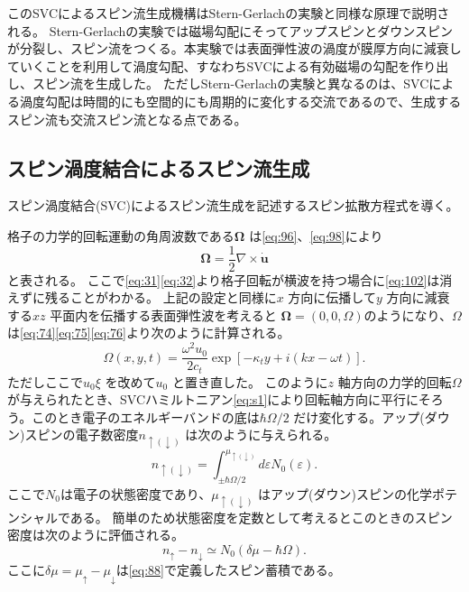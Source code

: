 \documentclass[dvipdfmx]{jsreport}
\numberwithin{equation}{chapter}
\numberwithin{table}{chapter}
\begin{document}
このSVCによるスピン流生成機構はStern-Gerlachの実験と同様な原理で説明される。
Stern-Gerlachの実験では磁場勾配にそってアップスピンとダウンスピンが分裂し、スピン流をつくる。本実験では表面弾性波の渦度が膜厚方向に減衰していくことを利用して渦度勾配、すなわちSVCによる有効磁場の勾配を作り出し、スピン流を生成した。
ただしStern-Gerlachの実験と異なるのは、SVCによる渦度勾配は時間的にも空間的にも周期的に変化する交流であるので、生成するスピン流も交流スピン流となる点である。
\subsection{スピン渦度結合によるスピン流生成}
スピン渦度結合(SVC)によるスピン流生成を記述するスピン拡散方程式を導く。

格子の力学的回転運動の角周波数である$\bm{\Omega}$ は\eqref{eq:96}、\eqref{eq:98}により
\begin{equation}
\label{eq:102}
	\bm{\Omega}=\frac{1}{2} \nabla \times \dot{\bm{u}}
\end{equation}
と表される。
ここで\eqref{eq:31}\eqref{eq:32}より格子回転が横波を持つ場合に\eqref{eq:102}は消えずに残ることがわかる。
上記の設定と同様に$x$ 方向に伝播して$y$ 方向に減衰する$xz$ 平面内を伝播する表面弾性波を考えると
$\bm{\Omega}=(0,0,\Omega)$のようになり、$\Omega$ は\eqref{eq:74}\eqref{eq:75}\eqref{eq:76}より次のように計算される。
\begin{equation}
\label{eq:103}
	\Omega(x,y,t)=\frac{\omega^2u_0}{2c_t}\exp \left[ -\kappa_t y+i(kx-\omega t) \right] 
.\end{equation}
ただしここで$u_0 \xi$ を改めて$u_0$ と置き直した。
このように$z$ 軸方向の力学的回転$\Omega$が与えられたとき、SVCハミルトニアン\eqref{eq:s1}により回転軸方向に平行にそろう。このとき電子のエネルギーバンドの底は$\hbar \Omega /2$ だけ変化する。アップ(ダウン)スピンの電子数密度$n_{\uparrow(\downarrow)}$
は次のように与えられる。
\begin{equation}
\label{eq:104}
	n_{\uparrow(\downarrow)}=\int_{\pm \hbar \Omega /2}^{\mu_{\uparrow(\downarrow)}} d\varepsilon N_0(\varepsilon)
.\end{equation}
ここで$ N_0$は電子の状態密度であり、$\mu_{\uparrow(\downarrow)}$ はアップ(ダウン)スピンの化学ポテンシャルである。
簡単のため状態密度を定数として考えるとこのときのスピン密度は次のように評価される。
\begin{equation}
\label{eq:105}
	n_{\uparrow}-n_{\downarrow}\simeq N_0(\delta\mu-\hbar \Omega)
.\end{equation}
ここに$\delta\mu=\mu_{\uparrow}-\mu_{\downarrow}$は\eqref{eq:88}で定義したスピン蓄積である。
\end{document}
